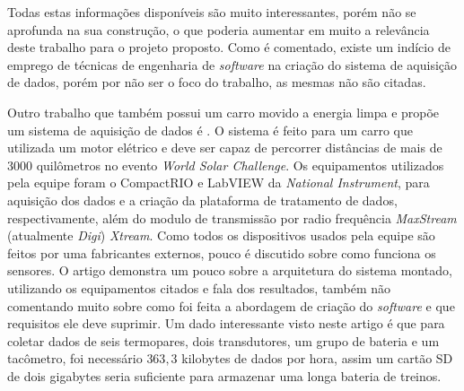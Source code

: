 Todas estas informações disponíveis são muito interessantes, porém \cite{gprsTelemetrySystem2013} não se aprofunda na sua construção, o que poderia aumentar em muito a relevância deste trabalho para o projeto proposto. Como é comentado, existe um indício de emprego de técnicas de engenharia de \textit{software} na criação do sistema de aquisição de dados, porém por não ser o foco do trabalho, as mesmas não são citadas. 

Outro trabalho que também possui um carro movido a energia limpa e propõe um sistema de aquisição de dados é \cite{applicationOfData2010}. O sistema é feito para um carro que utilizada um motor elétrico e deve ser capaz de percorrer distâncias de mais de 3000 quilômetros no evento \textit{World Solar Challenge}. Os equipamentos utilizados pela equipe foram o CompactRIO e LabVIEW da \textit{National Instrument}, para aquisição dos dados e a criação da plataforma de tratamento de dados, respectivamente, além do modulo de transmissão por radio frequência \textit{MaxStream} (atualmente \textit{Digi}) \textit{Xtream}. Como todos os dispositivos usados pela equipe são feitos por uma fabricantes externos, pouco é discutido sobre como funciona os sensores. O artigo demonstra um pouco sobre a arquitetura do sistema montado, utilizando os equipamentos citados e fala dos resultados, também não comentando muito sobre como foi feita a abordagem de criação do \textit{software} e que requisitos ele deve suprimir. Um dado interessante visto neste artigo é que para coletar dados de seis termopares, dois transdutores, um grupo de bateria e um tacômetro, foi necessário $363,3$ kilobytes de dados por hora, assim um cartão SD de dois gigabytes seria suficiente para armazenar uma longa bateria de treinos.

